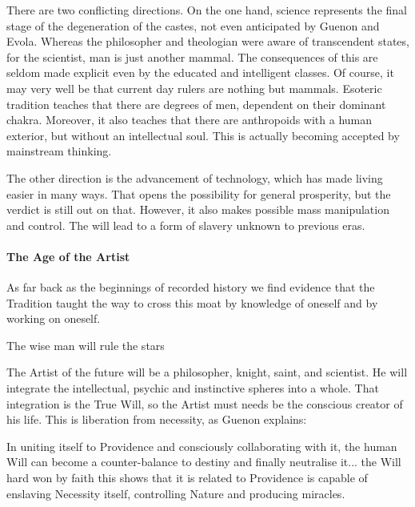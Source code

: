 There are two conflicting directions. On the one hand, science represents the final stage of the degeneration of the castes, not even anticipated by Guenon and Evola. Whereas the philosopher and theologian were aware of transcendent states, for the scientist, man is just another mammal. The consequences of this are seldom made explicit even by the educated and intelligent classes. Of course, it may very well be that current day rulers are nothing but mammals. Esoteric tradition teaches that there are degrees of men, dependent on their dominant chakra. Moreover, it also teaches that there are anthropoids with a human exterior, but without an intellectual soul. This is actually becoming accepted by mainstream thinking.

The other direction is the advancement of technology, which has made living easier in many ways. That opens the possibility for general prosperity, but the verdict is still out on that. However, it also makes possible mass manipulation and control. The will lead to a form of slavery unknown to previous eras.

\paragraph{The Age of the Artist}


\begin{quotex}
As far back as the beginnings of recorded history we find evidence that the Tradition taught the way to cross this moat by knowledge of oneself and by working on oneself.

The wise man will rule the stars
\end{quotex}


The Artist of the future will be a philosopher, knight, saint, and scientist. He will integrate the intellectual, psychic and instinctive spheres into a whole. That integration is the True Will, so the Artist must needs be the conscious creator of his life. This is liberation from necessity, as Guenon explains:

\begin{quotex}
In uniting itself to Providence and consciously collaborating with it, the human Will can become a counter-balance to destiny and finally neutralise it... the Will hard won by faith this shows that it is related to Providence is capable of enslaving Necessity itself, controlling Nature and producing miracles. 
\end{quotex}


